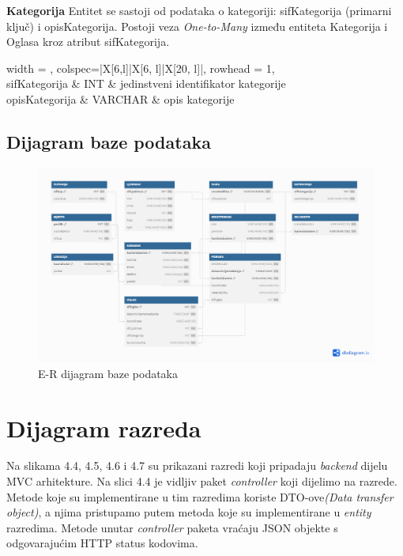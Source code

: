 \noindent \textbf{Kategorija} Entitet se sastoji od podataka o kategoriji: sifKategorija (primarni ključ) i opisKategorija. Postoji veza \textit{One-to-Many} između entiteta Kategorija i Oglasa kroz atribut sifKategorija.


\begin{longtblr}[
	label=none,
	entry=none
	]{
	width = \textwidth,
	colspec={|X[6,l]|X[6, l]|X[20, l]|},
	rowhead = 1,
	} %
	\hline {}                                      \\ \hline[3pt]
	sifKategorija & INT     & jedinstveni identifikator kategorije \\ \hline
	opisKategorija                    & VARCHAR & opis kategorije                      \\ \hline
\end{longtblr}


\subsection{Dijagram baze podataka}
\begin{figure}[h]
	\centering
	\includegraphics[width=1\textwidth]{slike/ERdiagram.png}
	\caption{E-R dijagram baze podataka}
	\label{fig:mesh1}
\end{figure}

\eject


\section{Dijagram razreda}

\noindent Na slikama 4.4, 4.5, 4.6 i 4.7 su prikazani razredi koji pripadaju \textit{backend} dijelu MVC arhitekture. Na slici 4.4 je vidljiv paket \textit{controller} koji dijelimo na razrede. Metode koje su implementirane u tim razredima koriste DTO-ove\textit{(Data transfer object)}, a njima pristupamo putem metoda koje su implementirane u \textit{entity} razredima. Metode unutar \textit{controller} paketa vraćaju JSON objekte s odgovarajućim HTTP status kodovima.

